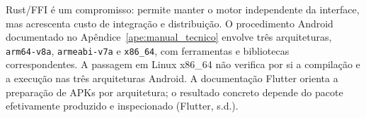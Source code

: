 Rust/FFI é um compromisso: permite manter o motor independente da interface, mas
acrescenta custo de integração e distribuição. O procedimento Android documentado
no Apêndice~\ref{ape:manual_tecnico} envolve três arquiteturas,
\texttt{arm64-v8a}, \texttt{armeabi-v7a} e \texttt{x86\_64}, com ferramentas e
bibliotecas correspondentes. A passagem em Linux x86\_64 não verifica por si a
compilação e a execução nas três arquiteturas Android. A documentação Flutter
orienta a preparação de APKs por arquitetura; o resultado concreto depende do
pacote efetivamente produzido e inspecionado (Flutter, s.d.).

